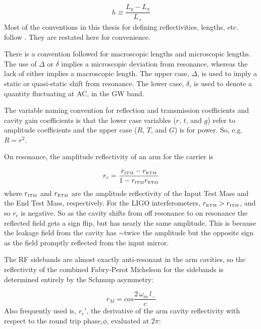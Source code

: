 \begin{equation}
h \equiv \frac{L_y-L_x}{L_{+}}
\end{equation}
Most of the conventions in this thesis for defining reflectivities, lengths,
etc. follow \cite{Sigg:FreqResp}. They are restated here for convenience.

There is a convention followed for macroscopic lengths and microscopic lengths.
The use of $\Delta$ or $\delta$ implies a microscopic deviation from resonance,
whereas the lack of either implies a macroscopic length. The upper case, $\Delta$,
is used to imply a static or quasi-static shift from resonance. The lower case,
$\delta$, is used to denote a quantity fluctuating at AC, in the GW band.

The variable naming convention for reflection and transmission coefficients and
cavity gain coefficients is that the lower case variables ($r$, $t$, and $g$) 
refer to amplitude coefficients and the upper case ($R$, $T$, and $G$) is for
power. So, e.g. $R = r^2$.

On resonance, the amplitude reflectivity of an arm for the carrier is

\begin{equation}
r_c = \frac{r_{\mbox{\tiny ITM}} - r_{\mbox{\tiny ETM}}}
           {1 - r_{\mbox{\tiny ITM}} r_{\mbox{\tiny ETM}}}
\label{eq:arm_reflectivity}
\end{equation}
where $r_{\mbox{\tiny ITM}}$ and $r_{\mbox{\tiny ETM}}$ are the amplitude 
reflectivity of the Input Test Mass and the End Test Mass, respectively. 
For the LIGO interferometers, $r_{\mbox{\tiny ETM}} > r_{\mbox{\tiny ITM}}$, 
and so $r_c$ is negative. So as the cavity shifts from
off resonance to on resonance the reflected field gets a sign flip, but has
nearly the same amplitude. This is because the leakage field from the
cavity has $\sim$twice the amplitude but the opposite sign as the field
promptly reflected from the input mirror.

The RF sidebands are almost exactly anti-resonant in the arm cavities, so the
reflectivity of the combined Fabry-Perot Michelson for the sidebands is 
determined entirely by the Schnuup asymmetry:

\begin{equation}
r_M = cos \frac{2 \, \omega_m \, l_{-}}{c}
\end{equation}
Also frequently used is, $r_c'$, the derivative of the arm cavity reflectivity
with respect to the round trip phase,$\phi$, evaluated at $2 \pi$:

